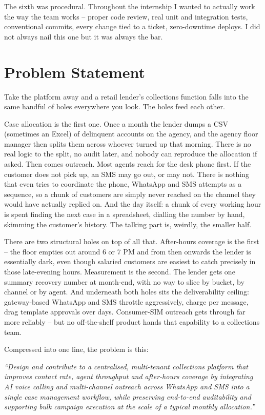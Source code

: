 The sixth was procedural. Throughout the internship I wanted to actually work the way the team works -- proper code review, real unit and integration tests, conventional commits, every change tied to a ticket, zero-downtime deploys. I did not always nail this one but it was always the bar.

\section{Problem Statement}
Take the platform away and a retail lender's collections function falls into the same handful of holes everywhere you look. The holes feed each other.

Case allocation is the first one. Once a month the lender dumps a CSV (sometimes an Excel) of delinquent accounts on the agency, and the agency floor manager then splits them across whoever turned up that morning. There is no real logic to the split, no audit later, and nobody can reproduce the allocation if asked. Then comes outreach. Most agents reach for the desk phone first. If the customer does not pick up, an SMS may go out, or may not. There is nothing that even tries to coordinate the phone, WhatsApp and SMS attempts as a sequence, so a chunk of customers are simply never reached on the channel they would have actually replied on. And the day itself: a chunk of every working hour is spent finding the next case in a spreadsheet, dialling the number by hand, skimming the customer's history. The talking part is, weirdly, the smaller half.

There are two structural holes on top of all that. After-hours coverage is the first -- the floor empties out around 6 or 7 PM and from then onwards the lender is essentially dark, even though salaried customers are easiest to catch precisely in those late-evening hours. Measurement is the second. The lender gets one summary recovery number at month-end, with no way to slice by bucket, by channel or by agent. And underneath both holes sits the deliverability ceiling: gateway-based WhatsApp and SMS throttle aggressively, charge per message, drag template approvals over days. Consumer-SIM outreach gets through far more reliably -- but no off-the-shelf product hands that capability to a collections team.

Compressed into one line, the problem is this:

\textit{``Design and contribute to a centralised, multi-tenant collections platform that improves contact rate, agent throughput and after-hours coverage by integrating AI voice calling and multi-channel outreach across WhatsApp and SMS into a single case management workflow, while preserving end-to-end auditability and supporting bulk campaign execution at the scale of a typical monthly allocation.''}

